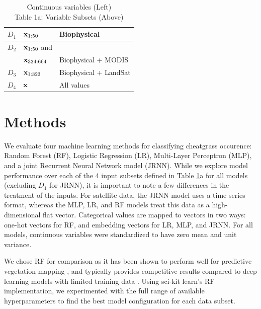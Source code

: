 \documentclass{article} %
\begin{document}
\begin{table}
\begin{minipage}{.48\textwidth}
\begin{tabularx}{\textwidth}{l |l| l}
\midrule
$D_1$ &$ {\bf x}_{1:50}$& Biophysical\\\hline
$D_2 $ & ${\bf x}_{1:50}$ and\\
&${\bf x}_{324:664}$&Biophysical + MODIS \\\hline
$D_3$  & ${\bf x}_{1:323}$&Biophysical + LandSat\\\hline
$D_4 $& ${\bf x}$&All values\\
\end{tabularx}
\caption{Continuous variables (Left)\\ Table 1a: Variable Subsets (Above)} \label{tab:data}
\end{minipage}
\end{table}

\section{Methods}
We evaluate four machine learning methods for classifying cheatgrass occurence: Random Forest (RF), Logistic Regression (LR), Multi-Layer Perceptron (MLP), and a joint Recurrent Neural Network model (JRNN). While we explore model performance over each of the 4 input subsets defined in Table \ref{tab:data}a for all models (excluding $D_1$ for JRNN), it is important to note a few differences in the treatment of the
inputs. For satellite data, the JRNN model uses a time series format, whereas the MLP, LR, and RF models treat this data as a high-dimensional flat vector. Categorical values are mapped to vectors in two ways: one-hot vectors for RF, and embedding vectors for LR, MLP, and JRNN.  
For all models, continuous variables were standardized to have zero mean and unit variance.  

We chose RF for comparison as it has been shown to perform well for predictive vegetation mapping \cite{cutler2007random}, 
and typically provides competitive results compared to deep learning models with limited training data \cite{kussul2017deep}. 
Using  sci-kit learn's \citep{pedregosa2011scikit} RF implementation, we experimented with the full range of available hyperparameters to find the best model configuration for each data subset.
\end{document}
